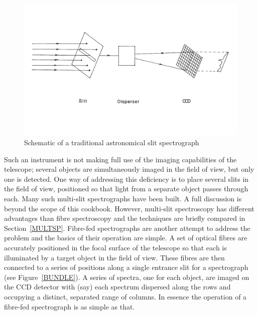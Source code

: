 \documentclass[twoside,11pt]{starlink}
\begin{document}
\begin{figure}[htbp]
   \centering
   \includegraphics[width=\textwidth]{sc14_spectrograph}
   \caption{Schematic of a traditional astronomical slit spectrograph
   \label{SLITSPR1} }
\end{figure}

Such an instrument is not making full use of the imaging capabilities of
the telescope; several objects are simultaneously imaged in the field of
view, but only one is detected.  One way of addressing this deficiency is
to place several slits in the field of view, positioned so that light
from a separate object passes through each.  Many such multi-slit
spectrographs have been built.  A full discussion is beyond the scope of
this cookbook.  However, multi-slit spectroscopy has different advantages
than fibre spectroscopy and the techniques are briefly compared in
Section~\ref{MULTSP}.  Fibre-fed spectrographs are another
attempt to address the problem and the basics of their operation are
simple.  A set of optical fibres are accurately positioned in the focal
surface of the telescope so that each is illuminated by a target object in
the field of view.  These fibres are then connected to a series of
positions along a single entrance slit for a spectrograph (see
Figure~\ref{BUNDLE}).  A series of spectra, one for each object, are
imaged on the CCD detector with (say) each spectrum dispersed along the
rows and occupying a distinct, separated range of columns.  In essence
the operation of a fibre-fed spectrograph is as simple as that.
\end{document}
